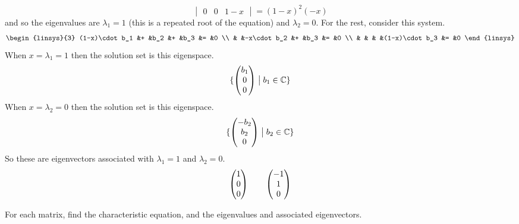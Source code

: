 \begin{exercises}
\begin{answer}
\begin{equation*}
\begin{vmatrix}
          0    &0   &1-x
        \end{vmatrix}
        =(1-x)^2(-x)
      \end{equation*}
      and so the eigenvalues are $\lambda_1=1$ (this is a repeated root
      of the equation) and $\lambda_2=0$.
      For the rest, consider this system.
      \begin{equation*}
        \begin{linsys}{3}
          (1-x)\cdot b_1  &+  &b_2         &+  &b_3            &=  &0  \\
                          &   &-x\cdot b_2 &+  &b_3            &=  &0  \\
                          &   &            &   &(1-x)\cdot b_3 &= &0  
        \end{linsys}
      \end{equation*}
      When $x=\lambda_1=1$ then the solution set is this eigenspace.
      \begin{equation*}
        \mbox{$\{\begin{pmatrix} b_1 \\ 0 \\ 0 \end{pmatrix}\bigm| b_1\in\mathbb{C}\}$}
      \end{equation*}
      When $x=\lambda_2=0$ then the solution set is this eigenspace.
      \begin{equation*}
        \mbox{$\{\begin{pmatrix} -b_2 \\ b_2 \\ 0 \end{pmatrix}\bigm| b_2\in\mathbb{C}\}$}
      \end{equation*}
      So these are eigenvectors associated with $\lambda_1=1$ and 
      $\lambda_2=0$.
      \begin{equation*}
        \begin{pmatrix} 1 \\ 0 \\ 0 \end{pmatrix}
        \qquad
        \begin{pmatrix} -1 \\ 1 \\ 0 \end{pmatrix}  
      \end{equation*}
    \end{answer}
  \recommended \item
    For each matrix, find the characteristic equation, and the
    eigenvalues and associated eigenvectors.
\end{exercises}
